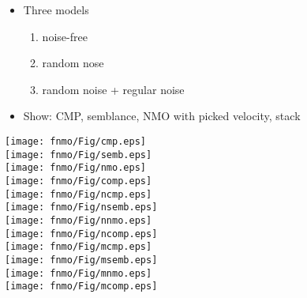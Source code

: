 \documentclass[25pt,headrule,footrule,dvips,landscape]{foils}
\begin{document}


\begin{itemize}
\item Three models
  \begin{enumerate}
  \item noise-free
  \item random nose
  \item random noise + regular noise
  \end{enumerate}
\item Show: CMP, semblance, NMO with picked velocity, stack
\end{itemize}

\texttt{[image: fnmo/Fig/cmp.eps]} \\
\texttt{[image: fnmo/Fig/semb.eps]} \\
\texttt{[image: fnmo/Fig/nmo.eps]} \\
\texttt{[image: fnmo/Fig/comp.eps]} \\
\texttt{[image: fnmo/Fig/ncmp.eps]} \\
\texttt{[image: fnmo/Fig/nsemb.eps]} \\
\texttt{[image: fnmo/Fig/nnmo.eps]} \\
\texttt{[image: fnmo/Fig/ncomp.eps]} \\
\texttt{[image: fnmo/Fig/mcmp.eps]} \\
\texttt{[image: fnmo/Fig/msemb.eps]} \\
\texttt{[image: fnmo/Fig/mnmo.eps]} \\
\texttt{[image: fnmo/Fig/mcomp.eps]} 
\end{document}
